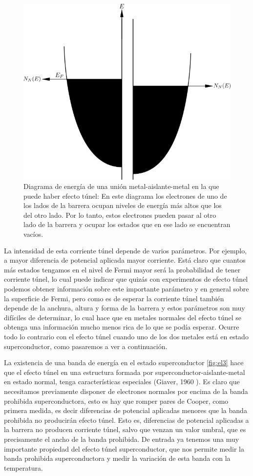 \begin{figure}[H]
\centering \includegraphics[width=0.8\linewidth]{img/el2.png}
\caption[Diagrama de energía de una unión metal-aislante-metal en la que puede haber efecto túnel]{Diagrama de energía de una unión metal-aislante-metal en la que puede haber efecto túnel: En este diagrama los electrones de uno de los lados de la barrera ocupan niveles de energía más altos que los del otro lado. Por lo tanto, estos electrones pueden pasar al otro lado de la barrera y ocupar los estados que en ese lado se encuentran vacíos.}
\label{fig:el2}
\end{figure}

La intensidad de esta corriente túnel depende de varios parámetros. Por ejemplo, a mayor diferencia de potencial aplicada mayor corriente. Está claro que cuantos más estados tengamos en el nivel de Fermi mayor será la probabilidad de tener corriente túnel, lo cual puede indicar que quizás con experimentos de efecto túnel podemos obtener información sobre este importante parámetro y en general sobre la superficie de Fermi, pero como es de esperar la corriente túnel también depende de la anchura, altura y forma de la barrera y estos parámetros son muy difíciles de determinar, lo cual hace que en metales normales del efecto túnel se obtenga una información mucho menos rica de lo que se podía esperar. Ocurre todo lo contrario con el efecto túnel cuando uno de los dos metales está en estado superconductor, como pasaremos a ver a continuación.

La existencia de una banda de energía en el estado superconductor \ref{fig:el3} hace que el efecto túnel en una estructura formada por superconductor-aislante-metal en estado normal, tenga características especiales (Giaver, 1960 \cite{giaever}). Es claro que necesitamos previamente disponer de electrones normales por encima de la banda prohibida superconductora, esto es hay que romper pares de Cooper, como primera medida, es decir diferencias de potencial aplicadas menores que la banda prohibida no producirán efecto túnel. Esto es, diferencias de potencial aplicadas a la barrera no producen corriente túnel, salvo que venzan un valor umbral, que es precisamente el ancho de la banda prohibida. De entrada ya tenemos una muy importante propiedad del efecto túnel superconductor, que nos permite medir la banda prohibida superconductora y medir la variación de esta banda con la temperatura.

